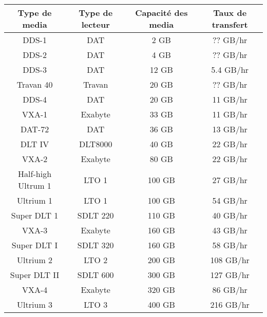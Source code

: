 \begin{tabular}{|c|c|c|c}
Type de media      & Type de lecteur & Capacit\'e des media & Taux de transfert \\ \hline
DDS-1              & DAT        & 2 GB &        ?? GB/hr   \\ \hline
DDS-2              & DAT        & 4 GB &        ?? GB/hr   \\ \hline
DDS-3              & DAT        & 12 GB &       5.4 GB/hr   \\ \hline
Travan 40          & Travan     & 20 GB &       ?? GB/hr    \\ \hline
DDS-4              & DAT        & 20 GB &       11 GB/hr    \\ \hline
VXA-1              & Exabyte    & 33 GB &       11 GB/hr    \\ \hline
DAT-72             & DAT        & 36 GB &       13 GB/hr    \\ \hline
DLT IV             & DLT8000    & 40 GB  &      22 GB/hr    \\ \hline
VXA-2              & Exabyte    & 80 GB &       22 GB/hr    \\ \hline
Half-high Ultrum 1 & LTO 1      & 100 GB &      27 GB/hr    \\ \hline
Ultrium 1          & LTO 1      & 100 GB &      54 GB/hr    \\ \hline
Super DLT 1        & SDLT 220   & 110 GB &      40 GB/hr    \\ \hline
VXA-3              & Exabyte    & 160 GB &      43 GB/hr    \\ \hline
Super DLT I        & SDLT 320   & 160 GB &      58 GB/hr    \\ \hline
Ultrium 2          & LTO 2      & 200 GB &      108 GB/hr   \\ \hline
Super DLT II       & SDLT 600   & 300 GB &      127 GB/hr   \\ \hline
VXA-4              & Exabyte    & 320 GB &      86 GB/hr    \\ \hline
Ultrium 3          & LTO 3      & 400 GB &      216 GB/hr   \\ \hline
\end{tabular}
